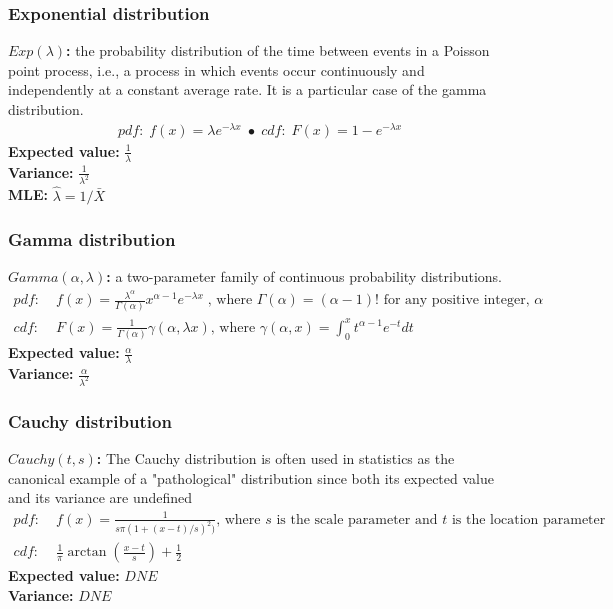 \documentclass{article}
\begin{document}
\subsubsection{Exponential distribution}
\textbf{$Exp(\lambda)$:} the probability distribution of the time between events in a Poisson point process, i.e., a process in which events occur continuously and independently at a constant average rate. It is a particular case of the gamma distribution.
\begin{align*}
    pdf: \; f(x) = \lambda e^{-\lambda x} \;\bullet\; cdf: \; F(x) = 1 - e^{-\lambda x}
\end{align*}
\textbf{Expected value:} $\frac{1}{\lambda}$\\
\textbf{Variance:} $\frac{1}{\lambda^2}$\\
\textbf{MLE:} $\hat{\lambda} = 1 / \bar{X}$

\subsubsection{Gamma distribution}
\textbf{$Gamma(\alpha, \lambda)$:} a two-parameter family of continuous probability distributions.
\begin{align*}
    pdf: & \; f(x) = \frac{\lambda^{\alpha}}{\Gamma(\alpha)}x^{\alpha-1} e^{-\lambda x} \; \textrm{, where } \Gamma(\alpha) = (\alpha - 1)! \textrm{ for any positive integer, } \alpha\\
    cdf: & \; F(x) =  \frac{1}{\Gamma(\alpha)}\gamma(\alpha, \lambda x) \textrm{, where } \gamma(\alpha, x) = \int_0^x t^{\alpha - 1}e^{-t}dt
\end{align*}
\textbf{Expected value:} $\frac{\alpha}{\lambda}$\\
\textbf{Variance:} $\frac{\alpha}{\lambda^2}$

\subsubsection{Cauchy distribution}
\textbf{$Cauchy(t, s)$:} The Cauchy distribution is often used in statistics as the canonical example of a "pathological" distribution since both its expected value and its variance are undefined
\begin{align*}
    pdf: & \; f(x) = \frac{1}{s \pi (1 + (x - t)/s)^2)} \textrm{, where } s \textrm{ is the scale parameter and } t \textrm{ is the location parameter}\\
    cdf: & \; \frac{1}{\pi} \arctan \left ( \frac{x - t}{s} \right ) + \frac{1}{2}
\end{align*}
\textbf{Expected value:} $DNE$\\
\textbf{Variance:} $DNE$
\end{document}
